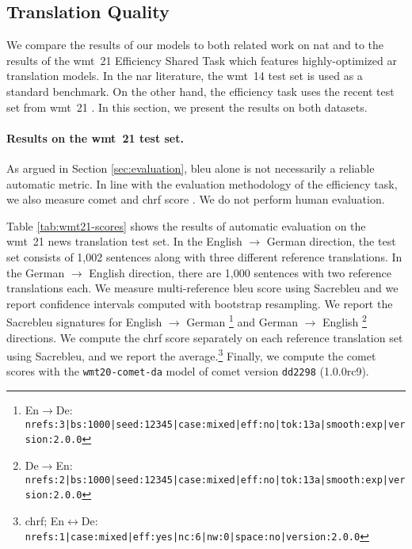 \subsection{Translation Quality}%
\label{subsec:results:quality}

We compare the results of our models to both related work on \ac{nat} and to
the results of the \ac{wmt}~21 Efficiency Shared Task which features
highly-optimized \ac{ar} translation models.  In the \ac{nar} literature, the
\acs{wmt}~14 test set \citep{bojar-etal-2014-findings} is used as a standard
benchmark. On the other hand, the efficiency task uses the recent test set from
\acs{wmt}~21 . In this section, we present the results on
both datasets.

\paragraph{Results on the \acs{wmt}~21 test set.}
As argued in Section \ref{sec:evaluation}, \acs{bleu} alone is not necessarily
a reliable automatic metric. In line with the evaluation methodology of the
efficiency task, we also measure \acs{comet} \citep{rei-etal-2020-comet} and
\acs{chrf} score \citep{popovic-2015-chrf}. We do not perform human evaluation.

Table \ref{tab:wmt21-scores} shows the results of automatic evaluation
on the \acs{wmt}~21 news translation test set. In the English $\rightarrow$
German direction, the test set consists of 1,002 sentences along with three
different reference translations. In the German $\rightarrow$ English
direction, there are 1,000 sentences with two reference translations each. We
measure multi-reference \acs{bleu} score using Sacrebleu \citep{post-2018-call}
and we report confidence intervals computed with bootstrap resampling. We
report the Sacrebleu signatures for English $\rightarrow$ German%
\footnote{En$\rightarrow$De: {\scriptsize
    \texttt{nrefs:3|bs:1000|seed:12345|case:mixed|eff:no|tok:13a|smooth:exp|version:2.0.0}}}
and German $\rightarrow$ English%
\footnote{De$\rightarrow$En: {\scriptsize
    \texttt{nrefs:2|bs:1000|seed:12345|case:mixed|eff:no|tok:13a|smooth:exp|version:2.0.0}}}
directions. We compute the \acs{chrf} score separately on each reference
translation set using Sacrebleu, and we report the
average.\footnote{\acs{chrf}; En$\leftrightarrow$De: {\scriptsize
    \texttt{nrefs:1|case:mixed|eff:yes|nc:6|nw:0|space:no|version:2.0.0}}}
Finally, we compute the \acs{comet} scores with the \texttt{wmt20-comet-da}
model of \acs{comet} version \texttt{dd2298} (1.0.0rc9).

